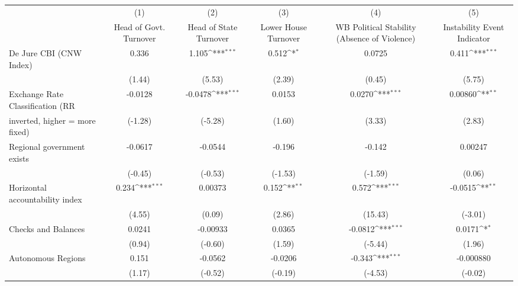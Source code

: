 {
\def\sym#1{\ifmmode^{#1}\else\(^{#1}\)\fi}
\begin{tabular}{l*{5}{c}}
\toprule
                                        &\multicolumn{1}{c}{(1)}&\multicolumn{1}{c}{(2)}&\multicolumn{1}{c}{(3)}&\multicolumn{1}{c}{(4)}&\multicolumn{1}{c}{(5)}\\
                                        &\multicolumn{1}{c}{Head of Govt. Turnover}&\multicolumn{1}{c}{Head of State Turnover}&\multicolumn{1}{c}{Lower House Turnover}&\multicolumn{1}{c}{WB Political Stability (Absence of Violence)}&\multicolumn{1}{c}{Instability Event Indicator}\\
\midrule
De Jure CBI (CNW Index)                 &0.336         &1.105\sym{***}&0.512\sym{*}  &0.0725         &0.411\sym{***}\\
                                        &(1.44)         &(5.53)         &(2.39)         &(0.45)         &(5.75)         \\
\addlinespace
Exchange Rate Classification (RR        &-0.0128         &-0.0478\sym{***}&0.0153         &0.0270\sym{***}&0.00860\sym{**} \\
inverted, higher = more fixed)          &(-1.28)         &(-5.28)         &(1.60)         &(3.33)         &(2.83)         \\
\addlinespace
Regional government exists              &-0.0617         &-0.0544         &-0.196         &-0.142         &0.00247         \\
                                        &(-0.45)         &(-0.53)         &(-1.53)         &(-1.59)         &(0.06)         \\
\addlinespace
Horizontal accountability index         &0.234\sym{***}&0.00373         &0.152\sym{**} &0.572\sym{***}&-0.0515\sym{**} \\
                                        &(4.55)         &(0.09)         &(2.86)         &(15.43)         &(-3.01)         \\
\addlinespace
Checks and Balances                     &0.0241         &-0.00933         &0.0365         &-0.0812\sym{***}&0.0171\sym{*}  \\
                                        &(0.94)         &(-0.60)         &(1.59)         &(-5.44)         &(1.96)         \\
\addlinespace
Autonomous Regions                      &0.151         &-0.0562         &-0.0206         &-0.343\sym{***}&-0.000880         \\
                                        &(1.17)         &(-0.52)         &(-0.19)         &(-4.53)         &(-0.02)         \\

\end{tabular}}
